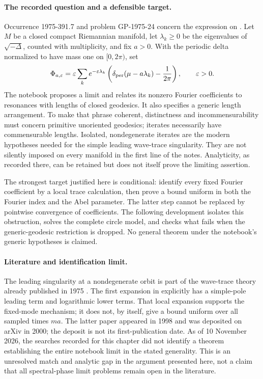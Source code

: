 \paragraph{The recorded question and a defensible target.}
Occurrence 1975-391.7 and problem GP-1975-24 concern the expression on
. Let \(M\) be a closed compact Riemannian manifold,
let \(\lambda_k\geq0\) be the eigenvalues of \(\sqrt{-\Delta}\), counted
with multiplicity, and fix \(a>0\). With the periodic delta normalized to
have mass one on \([0,2\pi)\), set
\[
 \Phi_{a,\varepsilon}=\varepsilon\sum_k e^{-\varepsilon\lambda_k}
 \left(\delta_{\rm per}(\mu-a\lambda_k)-\frac1{2\pi}\right),
 \qquad \varepsilon>0.
\]
The notebook proposes a limit and relates its nonzero Fourier coefficients
to resonances with lengths of closed geodesics. It also specifies a generic
length arrangement. To make that phrase coherent, distinctness and
incommensurability must concern primitive unoriented geodesics; iterates
necessarily have commensurable lengths. Isolated, nondegenerate iterates
are the modern hypotheses needed for the simple leading wave-trace
singularity. They are not silently imposed on every manifold in the first
line of the notes. Analyticity, as recorded there, can be retained but
does not itself prove the limiting assertion.

The strongest target justified here is conditional: identify every fixed
Fourier coefficient by a local trace calculation, then prove a bound
uniform in both the Fourier index and the Abel parameter. The latter
step cannot be replaced by pointwise convergence of coefficients. The
following development isolates this obstruction, solves the complete
circle model, and checks what fails when the generic-geodesic restriction
is dropped. No general theorem under the notebook's generic hypotheses
is claimed.

\paragraph{Literature and identification limit.}
The leading singularity at a nondegenerate orbit is part of the
wave-trace theory already published in 1975
\citep{duistermaatguillemin1975spectrum}.
The first expansion in \citet[Introduction]{zelditch1998wave} explicitly
has a simple-pole leading term and logarithmic lower terms. That local
expansion supports the fixed-mode mechanism; it does not, by itself,
give a bound uniform over all sampled times \(ma\).
The latter paper appeared in 1998 and was deposited on arXiv in 2000;
the deposit is not its first-publication date.
As of 10 November 2026, the searches recorded for this chapter did not
identify a theorem establishing the entire notebook limit in the stated
generality. This is an unresolved match and analytic gap in the argument
presented here, not a claim that all spectral-phase limit problems remain
open in the literature.

